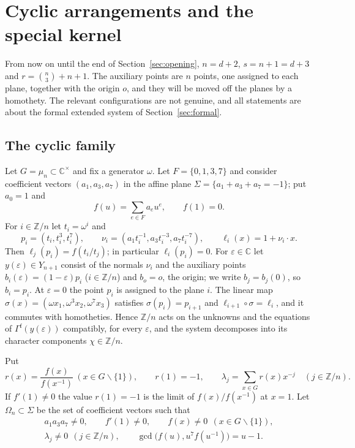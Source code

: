\documentclass{amsart}
\theoremstyle{definition}
\theoremstyle{remark}
\numberwithin{equation}{section}
\newcommand{\CC}{\mathbb{C}}
\newcommand{\ZZ}{\mathbb{Z}}
\begin{document}
\section{Cyclic arrangements and the special kernel}\label{sec:cyclic}

From now on until the end of Section~\ref{sec:opening}, $n=d+2$, $s=n+1=d+3$ and
$r=\binom n3+n+1$. The auxiliary points are $n$ points, one assigned to each plane,
together with the origin $o$, and they will be moved off the planes by a homothety.
The relevant configurations are not genuine, and all statements are about the
formal extended system of Section~\ref{sec:formal}.

\subsection{The cyclic family}\label{sec:cycfam}
Let $G=\mu_n\subset\CC^\times$ and fix a generator $\omega$. Let $F=\{0,1,3,7\}$ and
consider coefficient vectors $(a_1,a_3,a_7)$ in the affine plane
$\Sigma=\{a_1+a_3+a_7=-1\}$; put $a_0=1$ and
\[
  f(u)=\sum_{e\in F}a_eu^e,\qquad f(1)=0 .
\]
For $i\in\ZZ/n$ let $t_i=\omega^i$ and
\[
  p_i=(t_i,t_i^3,t_i^7),\qquad \nu_i=(a_1t_i^{-1},a_3t_i^{-3},a_7t_i^{-7}),\qquad
  \ell_i(x)=1+\nu_i\cdot x .
\]
Then $\ell_j(p_i)=f(t_i/t_j)$; in particular $\ell_i(p_i)=0$. For $\varepsilon\in\CC$ let
$y(\varepsilon)\in Y_{n+1}$ consist of the normals $\nu_i$ and the auxiliary points
$b_i(\varepsilon)=(1-\varepsilon)p_i$ ($i\in\ZZ/n$) and $b_o=o$, the origin; we write
$b_j=b_j(0)$, so $b_i=p_i$. At $\varepsilon=0$ the point $p_i$ is assigned to the plane
$i$. The linear map $\sigma(x)=(\omega x_1,\omega^3x_2,\omega^7x_3)$ satisfies
$\sigma(p_i)=p_{i+1}$ and $\ell_{i+1}\circ\sigma=\ell_i$, and it commutes with
homotheties. Hence $\ZZ/n$ acts on the unknowns and the equations of
$\Gamma^{\mathrm f}(y(\varepsilon))$ compatibly, for every $\varepsilon$, and the
system decomposes into its character components $\chi\in\ZZ/n$.

Put
\[
  r(x)=\frac{f(x)}{f(x^{-1})}\ (x\in G\smallsetminus\{1\}),\qquad r(1)=-1,\qquad
  \lambda_j=\sum_{x\in G}r(x)x^{-j}\quad(j\in\ZZ/n).
\]
If $f'(1)\ne0$ the value $r(1)=-1$ is the limit of $f(x)/f(x^{-1})$ at $x=1$. Let
$\Omega_n\subset\Sigma$ be the set of coefficient vectors such that
\begin{equation}\label{eq:denomopen}
\begin{gathered}
  a_1a_3a_7\ne0,\qquad f'(1)\ne0,\qquad f(x)\ne0\ \ (x\in G\smallsetminus\{1\}),\\
  \lambda_j\ne0\ \ (j\in\ZZ/n),\qquad \gcd\bigl(f(u),u^7f(u^{-1})\bigr)=u-1 .
\end{gathered}
\end{equation}
\end{document}
